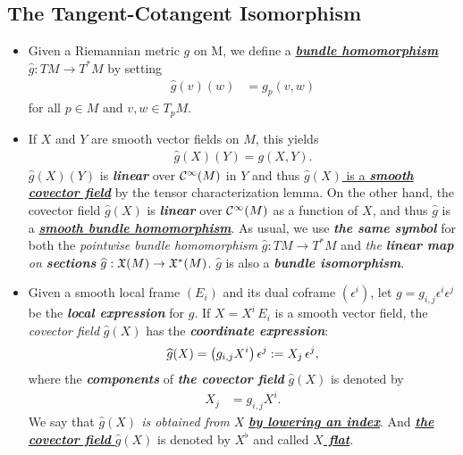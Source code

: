 \documentclass[11pt]{article}
\begin{document}
\subsection{The Tangent-Cotangent Isomorphism}
\begin{itemize}
\item \begin{definition}
Given a Riemannian metric $g$ on M, we define a \underline{\emph{\textbf{bundle homomorphism}}} $\widehat{g}: TM \rightarrow T^{*}M$ by setting
\begin{align*}
\widehat{g}(v)(w) &= g_{p}(v, w)
\end{align*} for all $p \in M$ and $v, w \in T_{p}M$.
\end{definition}

\item \begin{remark}
 If $X$ and $Y$ are smooth vector fields on $M$, this yields
\begin{align*}
\widehat{g}(X)(Y) = g(X, Y).
\end{align*} $\widehat{g}(X)(Y)$ is \emph{\textbf{linear}} over ${\mathcal C}^{\infty}(M)$ in $Y$ and thus \underline{$\widehat{g}(X)$ is a \emph{\textbf{smooth covector field}}} by the tensor characterization lemma. On the other hand, the covector field $\widehat{g}(X)$ is \emph{\textbf{linear}} over ${\mathcal C}^{\infty}(M)$ as a function of $X$, and thus $\widehat{g}$ is a \underline{\emph{\textbf{smooth bundle homomorphism}}}. As usual, we use \textbf{\emph{the same symbol}} for both the \emph{pointwise bundle homomorphism} $\widehat{g}: TM \rightarrow T^{*}M$ and \emph{the \textbf{linear map} on \textbf{sections}} $\widehat{g}: {\mathfrak X}(M) \rightarrow {\mathfrak X}^{*}(M)$. $\widehat{g}$ is also a \emph{\textbf{bundle isomorphism}}.
\end{remark}

\item \begin{definition}
Given a smooth local frame $(E_i)$ and its dual coframe $(\epsilon^i)$, let $g = g_{i,j}\epsilon^i \epsilon^j$ be the \emph{\textbf{local expression}} for $g$. If $X= X^i\,E_i$ is a smooth vector field, the \emph{covector field} $\widehat{g}(X)$ has the \emph{\textbf{coordinate expression}}:
\begin{align*}
\widehat{g}(X) = \left(g_{i,j}X^i\right) \epsilon^j := X_j\,\epsilon^j,
\end{align*} where the \emph{\textbf{components}} of \emph{\textbf{the covector field}} $\widehat{g}(X)$ is denoted by 
\begin{align}
X_j &= g_{i,j}X^i. \label{eqn: rieman_lower_index}
\end{align} We say that \emph{$\widehat{g}(X)$ is obtained from $X$} \underline{\emph{\textbf{by lowering an index}}}. And \underline{\emph{\textbf{the covector field}} $\widehat{g}(X)$} is denoted by \underline{$X^{\flat}$} and called \underline{\emph{\textbf{$X$ flat}}}.
\end{definition} 


\end{itemize}
\end{document}
